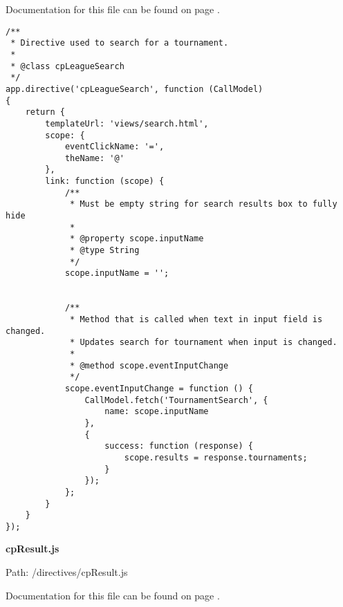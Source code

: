 Documentation for this file can be found on page \pageref{cpLeagueSearch.js.doc}.

{\scriptsize
\begin{lstlisting}
/**
 * Directive used to search for a tournament.
 *
 * @class cpLeagueSearch
 */
app.directive('cpLeagueSearch', function (CallModel)
{
	return {
		templateUrl: 'views/search.html',
		scope: {
			eventClickName: '=',
			theName: '@'
		},
		link: function (scope) {
			/**
			 * Must be empty string for search results box to fully hide
			 *
			 * @property scope.inputName
			 * @type String
			 */
			scope.inputName = '';
			

			/**
			 * Method that is called when text in input field is changed.
			 * Updates search for tournament when input is changed.
			 *
			 * @method scope.eventInputChange
			 */
			scope.eventInputChange = function () {
				CallModel.fetch('TournamentSearch', {
					name: scope.inputName
				},
				{
					success: function (response) {
						scope.results = response.tournaments;
					}
				});
			};
		}
	}
});\end{lstlisting}
}
\textbf{cpResult.js}\label{cpResult.js}

Path: /directives/cpResult.js

Documentation for this file can be found on page \pageref{cpResult.js.doc}.

